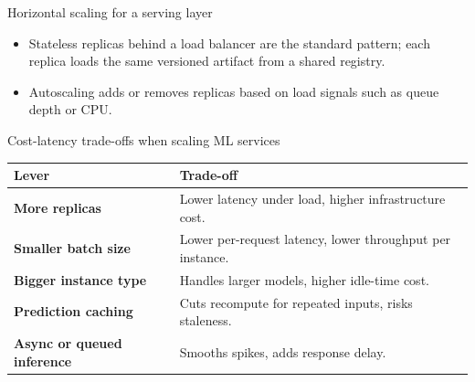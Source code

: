 \begin{frame}{Horizontal scaling for a serving layer}
\centering
{}
\vspace{0.5em}
\begin{itemize}
\item Stateless replicas behind a load balancer are the standard pattern; each replica loads the same versioned artifact from a shared registry.
\item Autoscaling adds or removes replicas based on load signals such as queue depth or CPU.
\end{itemize}
\coursefooter
\end{frame}

\begin{frame}{Cost-latency trade-offs when scaling ML services}
\begin{tabularx}{\textwidth}{>{\bfseries}l X}
Lever & Trade-off \\
\toprule
More replicas & Lower latency under load, higher infrastructure cost. \\
Smaller batch size & Lower per-request latency, lower throughput per instance. \\
Bigger instance type & Handles larger models, higher idle-time cost. \\
Prediction caching & Cuts recompute for repeated inputs, risks staleness. \\
Async or queued inference & Smooths spikes, adds response delay. \\
\bottomrule
\end{tabularx}
\coursefooter
\end{frame}

